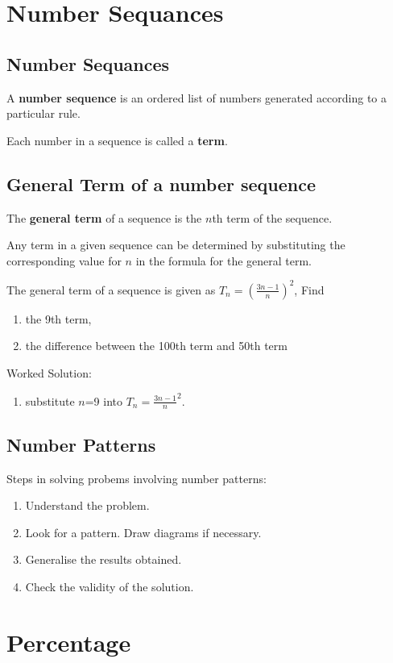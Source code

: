 \documentclass[../main]{subfiles}
\begin{document}
\section{Number Sequances}
\subsection{Number Sequances}
A \textbf{number sequence} is an ordered list of numbers generated according to
a particular rule.

Each number in a sequence is called a \textbf{term}.

\subsection{General Term of a number sequence}
The \textbf{general term} of a sequence is the $n$th term of the sequence.

Any term in a given sequence can be determined by substituting the corresponding
value for $n$ in the formula for the general term.

The general term of a sequence is given as \(T_n=(\frac {3n-1} n)^2\), Find
\begin{enumerate}[label=(\alph{*})]
\item the 9th term,
 
\item the difference between the 100th term and 50th term 
\end{enumerate}

Worked Solution:
\begin{enumerate}[label=(\alph{*})]
\item substitute $n$=9 into \(T_n={\frac {3n-1} n}^2\).
\end{enumerate}

\subsection{Number Patterns}
Steps in solving probems involving number patterns:
\begin{enumerate}[label=(\alph{*})]
\item Understand the problem.
\item Look for a pattern. Draw diagrams if necessary.  
\item Generalise the results obtained.
\item Check the validity of the solution.
\end{enumerate}

\section{Percentage}
\end{document}
